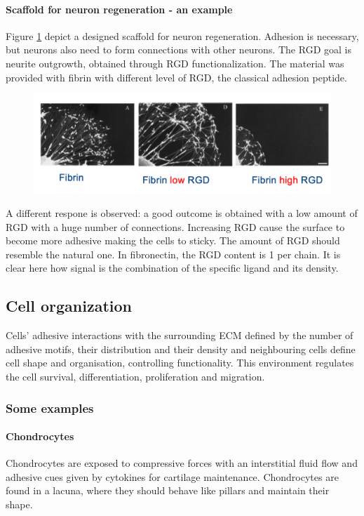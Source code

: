 			\paragraph{Scaffold for neuron regeneration - an example}
			Figure \ref{fig:fibrin} depict a designed scaffold for neuron regeneration.
			Adhesion is necessary, but neurons also need to form connections with other neurons.
			The RGD goal is neurite outgrowth, obtained through RGD functionalization.
			The material was provided with fibrin with different level of RGD, the classical adhesion peptide.

			\begin{figure}[h]
				\includegraphics[width=1\textwidth]{fibrin}
				\caption{\label{fig:fibrin}}
			\end{figure}

			A different respone is observed: a good outcome is obtained with a low amount of RGD with a huge number of connections.
			Increasing RGD cause the surface to become more adhesive making the cells to sticky.
			The amount of RGD should resemble the natural one.
			In fibronectin, the RGD content is 1 per chain.
			It is clear here how signal is the combination of the specific ligand and its density.


	\subsection{Cell organization}
	Cells' adhesive interactions with the surrounding ECM defined by the number of adhesive motifs, their distribution and their density and neighbouring cells define cell shape and organisation, controlling functionality.
	This environment regulates the cell survival, differentiation, proliferation and migration.

		\subsubsection{Some examples}

			\paragraph{Chondrocytes}
			Chondrocytes are exposed to compressive forces with an interstitial fluid flow and adhesive cues given by cytokines for cartilage maintenance.
			Chondrocytes are found in a lacuna, where they should behave like pillars and maintain their shape.

